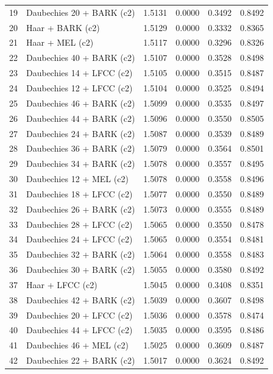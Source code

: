 \begin{longtable}{@{}rlrrrr@{}}
19 & Daubechies 20 + BARK (c2) & 1.5131 & 0.0000 & 0.3492 & 0.8492 \\
20 & Haar + BARK (c2) & 1.5129 & 0.0000 & 0.3332 & 0.8365 \\
21 & Haar + MEL (c2) & 1.5117 & 0.0000 & 0.3296 & 0.8326 \\
22 & Daubechies 40 + BARK (c2) & 1.5107 & 0.0000 & 0.3528 & 0.8498 \\
23 & Daubechies 14 + LFCC (c2) & 1.5105 & 0.0000 & 0.3515 & 0.8487 \\
24 & Daubechies 12 + LFCC (c2) & 1.5104 & 0.0000 & 0.3525 & 0.8494 \\
25 & Daubechies 46 + BARK (c2) & 1.5099 & 0.0000 & 0.3535 & 0.8497 \\
26 & Daubechies 44 + BARK (c2) & 1.5096 & 0.0000 & 0.3550 & 0.8505 \\
27 & Daubechies 24 + BARK (c2) & 1.5087 & 0.0000 & 0.3539 & 0.8489 \\
28 & Daubechies 36 + BARK (c2) & 1.5079 & 0.0000 & 0.3564 & 0.8501 \\
29 & Daubechies 34 + BARK (c2) & 1.5078 & 0.0000 & 0.3557 & 0.8495 \\
30 & Daubechies 12 + MEL (c2) & 1.5078 & 0.0000 & 0.3558 & 0.8496 \\
31 & Daubechies 18 + LFCC (c2) & 1.5077 & 0.0000 & 0.3550 & 0.8489 \\
32 & Daubechies 26 + BARK (c2) & 1.5073 & 0.0000 & 0.3555 & 0.8489 \\
33 & Daubechies 28 + LFCC (c2) & 1.5065 & 0.0000 & 0.3550 & 0.8478 \\
34 & Daubechies 24 + LFCC (c2) & 1.5065 & 0.0000 & 0.3554 & 0.8481 \\
35 & Daubechies 32 + BARK (c2) & 1.5064 & 0.0000 & 0.3558 & 0.8483 \\
36 & Daubechies 30 + BARK (c2) & 1.5055 & 0.0000 & 0.3580 & 0.8492 \\
37 & Haar + LFCC (c2) & 1.5045 & 0.0000 & 0.3408 & 0.8351 \\
38 & Daubechies 42 + BARK (c2) & 1.5039 & 0.0000 & 0.3607 & 0.8498 \\
39 & Daubechies 20 + LFCC (c2) & 1.5036 & 0.0000 & 0.3578 & 0.8474 \\
40 & Daubechies 44 + LFCC (c2) & 1.5035 & 0.0000 & 0.3595 & 0.8486 \\
41 & Daubechies 46 + MEL (c2) & 1.5025 & 0.0000 & 0.3609 & 0.8487 \\
42 & Daubechies 22 + BARK (c2) & 1.5017 & 0.0000 & 0.3624 & 0.8492 \\

\end{longtable}
